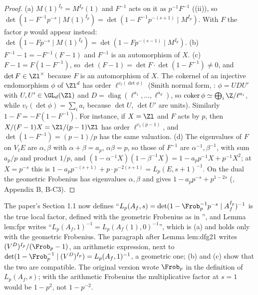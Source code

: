 \begin{proof}
(a) $M(1)^{I_p}=M^{I_p}(1)$ and $F^{-1}$ acts on it as $p^{-1}F^{-1}$ ((ii)), so $\det(1-F^{-1}p^{-s}\mid M(1)^{I_p})=\det(1-F^{-1}p^{-(s+1)}\mid M^{I_p})$.
With $F$ the factor $p$ would appear instead: $\det(1-Fp^{-s}\mid M(1)^{I_p})=\det(1-Fp^{-(s-1)}\mid M^{I_p})$. (b) $F^{-1}-1=-F^{-1}(F-1)$ and $F^{-1}$ is an
automorphism of $X$. (c) $F-1=F(1-F^{-1})$, so $\det(F-1)=\det F\cdot\det(1-F^{-1})\ne0$, and $\det F\in\Zl^\times$ because $F$ is an automorphism of $X$. The
cokernel of an injective endomorphism $\phi$ of $\Zl^d$ has order $\ell^{v_\ell(\det\phi)}$ (Smith normal form, : $\phi=UDU'$ with $U,U'\in\GL_d(\Zl)$ and
$D=\operatorname{diag}(\ell^{a_1},\dots,\ell^{a_d})$, so $\operatorname{coker}\phi\simeq\bigoplus_i\Z/\ell^{a_i}$, while $v_\ell(\det\phi)=\sum_ia_i$ because $\det U$, $\det U'$ are units). Similarly $1-F=-F(1-F^{-1})$.
For instance, if $X=\Zl$ and $F$ acts by $p$, then $X/(F-1)X=\Zl/(p-1)\Zl$ has order $\ell^{v_\ell(p-1)}$, and $\det(1-F^{-1})=(p-1)/p$ has the same valuation. (d) The
eigenvalues of $F$ on $V_\ell E$ are $\alpha,\beta$ with $\alpha+\beta=a_p$, $\alpha\beta=p$, so those of $F^{-1}$ are $\alpha^{-1},\beta^{-1}$, with sum $a_p/p$ and product
$1/p$, and $(1-\alpha^{-1}X)(1-\beta^{-1}X)=1-a_pp^{-1}X+p^{-1}X^2$; at $X=p^{-s}$ this is $1-a_pp^{-(s+1)}+p\cdot p^{-2(s+1)}=L_p(E,s+1)^{-1}$. On the dual the
geometric Frobenius has eigenvalues $\alpha,\beta$ and gives $1-a_pp^{-s}+p^{1-2s}$ (, Appendix B, B-C3).
\end{proof}

\begin{paperlink}
The paper's Section 1.1 now defines ``$L_p(A_f,s)=\det(1-\Frob_p^{-1}p^{-s}\mid A_f^{I_p})^{-1}$ is the true local factor, defined with the geometric
Frobenius as in \cite[\S1.1.1]{DFG04}'', and Lemma lem:fpr writes ``$L_p(A_f,1)^{-1}=L_p(A_f(1),0)^{-1}$'', which is (a) and holds only with the
geometric Frobenius. The paragraph after Lemma lem:dfg21 writes $(V^D)^{I_p}/(\Frob_p-1)$, an arithmetic expression, next to
$\det(1-\Frob_p^{-1}\mid(V^D)^{I_p})=L_p(A_f,1)^{-1}$, a geometric one; (b) and (c) show that the two are compatible. The original version wrote
$\Frob_p$ in the definition of $L_p(A_f,s)$; with the arithmetic Frobenius the multiplicative factor at $s=1$ would be $1-p^2$, not $1-p^{-2}$.
\end{paperlink}

